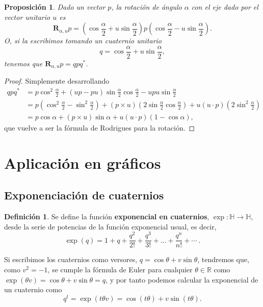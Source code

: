 \documentclass{article}
\theoremstyle{plain}
\newtheorem{proposition}{Proposición}
\theoremstyle{definition}
\newtheorem{definition}{Definición}
\theoremstyle{remark}
\begin{document}
\begin{proposition}
Dado un vector $p$, la rotación de ángulo $\alpha$ con el eje dado por
el vector unitario $u$ es
\[ \mathbf{R}_{\alpha,u}p =
  \left(\cos \frac{\alpha}{2} + u \sin \frac{\alpha}{2}\right)
  p
  \left(\cos \frac{\alpha}{2} - u \sin \frac{\alpha}{2}\right).\]
O, si la escribimos tomando un cuaternio unitario
\[
  q = \cos \frac{\alpha}{2} + u \sin \frac{\alpha}{2},
\]
tenemos que $\mathbf{R}_{\alpha,u}p = qpq^\ast $.
\end{proposition}
\begin{proof}
  Simplemente desarrollando
  \[\begin{aligned}
      qpq^\ast &=
      p \cos^2\frac{\alpha}{2} + (up-pu)\sin\frac{\alpha}{2}\cos\frac{\alpha}{2} - upu\sin\frac{\alpha}{2}
      \\&=
      p \left(\cos^2\frac{\alpha}{2} - \sin^2\frac{\alpha}{2} \right) +
      (p \times u)\left(2\sin\frac{\alpha}{2}\cos\frac{\alpha}{2}\right) +
      u(u\cdot p)\left(2\sin^2\frac{\alpha}{2}\right)
      \\&=
      p \cos\alpha +
      (p \times u)\sin\alpha +
      u(u\cdot p)\left(1 - \cos \alpha\right),
    \end{aligned}\]
  que vuelve a ser la fórmula de Rodrigues para la rotación.
\end{proof}

\section{Aplicación en gráficos}

\subsection{Exponenciación de cuaternios}
\begin{definition}
  Se define la función \textbf{exponencial en cuaternios},
  $\exp \colon \mathbb{H} \to \mathbb{H}$, desde la serie de potencias
  de la función exponencial usual, es decir,
  \[\exp(q) =  1 + q + \frac{q^2}{2!} + \frac{q^3}{3!} + \dots + \frac{q^n}{n!} + \cdots\ .
  \]
\end{definition}

Si escribimos los cuaternios como versores,
$q = \cos \theta + v \sin \theta$, tendremos que, como $v^2 = -1$, se
cumple la fórmula de Euler para cualquier $\theta \in \mathbb{R}$ como
$\exp(\theta v) = \cos \theta + v \sin \theta = q$, y por tanto
podemos calcular la exponencial de un cuaternio como
\[q^t = \exp(t \theta v) = \cos (t \theta) + v \sin (t \theta).\]
\end{document}
